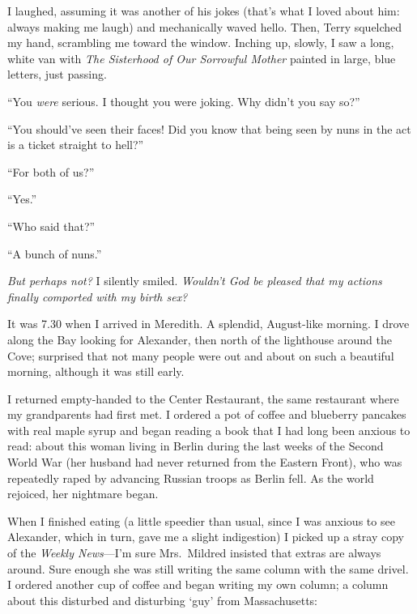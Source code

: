 I laughed, assuming it was another of his jokes (that's what I loved
about him: always making me laugh) and mechanically waved hello. Then,
Terry squelched my hand, scrambling me toward the window. Inching up,
slowly, I saw a long, white van with \emph{The Sisterhood of Our
Sorrowful Mother} painted in large, blue letters, just passing.

``You \emph{were} serious. I thought you were joking. Why didn't you say
so?''

``You should've seen their faces! Did you know that being seen by nuns
in the act is a ticket straight to hell?''

``For both of us?''

``Yes.''

``Who said that?''

``A bunch of nuns.''

\emph{But perhaps not?} I silently smiled. \emph{Wouldn't God be pleased
that my actions finally comported with my birth sex?}

It was 7.30 when I arrived in Meredith. A splendid, August-like morning.
I drove along the Bay looking for Alexander, then north of the
lighthouse around the Cove; surprised that not many people were out and
about on such a beautiful morning, although it was still early.

I returned empty-handed to the Center Restaurant, the same restaurant
where my grandparents had first met. I ordered a pot of coffee and
blueberry pancakes with real maple syrup and began reading a book that I
had long been anxious to read: about this woman living in Berlin during
the last weeks of the Second World War (her husband had never returned
from the Eastern Front), who was repeatedly raped by advancing Russian
troops as Berlin fell. As the world rejoiced, her nightmare began.

When I finished eating (a little speedier than usual, since I was
anxious to see Alexander, which in turn, gave me a slight indigestion) I
picked up a stray copy of the \emph{Weekly News}---I'm sure Mrs.~Mildred
insisted that extras are always around. Sure enough she was still
writing the same column with the same drivel. I ordered another cup of
coffee and began writing my own column; a column about this disturbed
and disturbing `guy' from Massachusetts:

